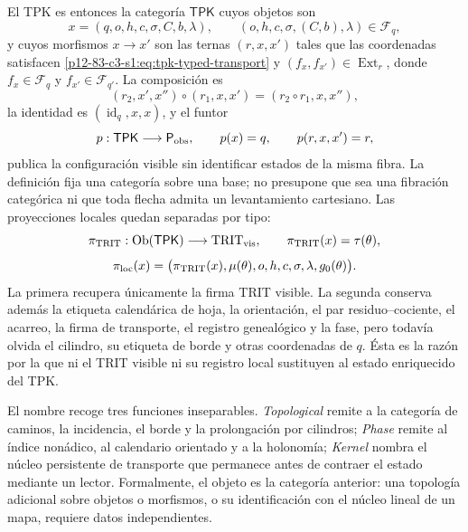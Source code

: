 El TPK es entonces la categoría \(\mathsf{TPK}\) cuyos objetos son
\begin{equation}
x=(q,o,h,c,\sigma,C,b,\lambda),
\qquad (o,h,c,\sigma,(C,b),\lambda)\in\mathcal F_q,
\label{p12-83-c3-s1:eq:tpk-enriched-object}
\end{equation}
y cuyos morfismos \(x\to x'\) son las ternas \((r,x,x')\) tales que
las coordenadas satisfacen \eqref{p12-83-c3-s1:eq:tpk-typed-transport} y
\((f_x,f_{x'})\in\operatorname{Ext}_r\), donde
\(f_x\in\mathcal F_q\) y \(f_{x'}\in\mathcal F_{q'}\). La composición es
\begin{equation}
(r_2,x',x'')\circ(r_1,x,x')
=(r_2\circ r_1,x,x''),
\label{p12-83-c3-s1:eq:tpk-morphism-composition}
\end{equation}
la identidad es \((\operatorname{id}_q,x,x)\), y el funtor
\begin{equation}
p:\mathsf{TPK}\longrightarrow\mathsf P_{\rm obs},
\qquad p(x)=q,
\qquad p(r,x,x')=r,
\label{p12-83-c3-s1:eq:tpk-base-functor}
\end{equation}
publica la configuración visible sin identificar estados de la misma fibra.
La definición fija una categoría sobre una base; no presupone que sea una
fibración categórica ni que toda flecha admita un levantamiento cartesiano.
Las proyecciones locales quedan separadas por tipo:
\[
\pi_{\rm TRIT}:\operatorname{Ob}(\mathsf{TPK})
\longrightarrow\mathrm{TRIT}_{\rm vis},
\qquad
\pi_{\rm TRIT}(x)=\tau(\theta),
\]
\[
\pi_{\rm loc}(x)=
\bigl(\pi_{\rm TRIT}(x),\mu(\theta),o,h,c,
\sigma,\lambda,g_0(\theta)\bigr).
\]
La primera recupera únicamente la firma TRIT visible. La segunda conserva
además la etiqueta calendárica de hoja, la orientación, el par
residuo--cociente, el acarreo, la firma de transporte, el registro genealógico y la fase,
pero todavía olvida el cilindro, su etiqueta de borde y otras coordenadas de
\(q\). Ésta es la razón por la que ni el TRIT visible ni su registro local
sustituyen al estado enriquecido del TPK.

El nombre recoge tres funciones inseparables. \emph{Topological} remite a
la categoría de caminos, la incidencia, el borde y la prolongación por
cilindros; \emph{Phase} remite al índice nonádico, al calendario orientado y
a la holonomía; \emph{Kernel} nombra el núcleo persistente de transporte que
permanece antes de contraer el estado mediante un lector. Formalmente, el
objeto es la categoría anterior: una topología adicional sobre objetos o
morfismos, o su identificación con el núcleo lineal de un mapa, requiere
datos independientes.

